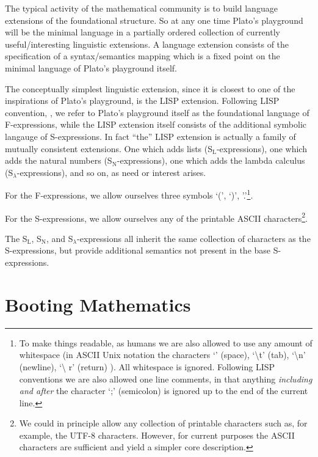 The typical activity of the mathematical community is to build language
extensions of the foundational structure. So at any one time Plato's playground
will be the minimal language in a partially ordered collection of currently
useful/interesting linguistic extensions. A language extension consists of the
specification of a syntax/semantics mapping which is a fixed point on the
minimal language of Plato's playground itself.

The conceptually simplest linguistic extension, since it is closest to one of
the inspirations of Plato's playground, is the LISP extension. Following LISP
convention, \cite{mcCarthy1960lisp}, we refer to Plato's playground itself as
the foundational language of F-expressions, while the LISP extension itself
consists of the additional symbolic langauge of S-expressions. In fact ``the''
LISP extension is actually a family of mutually consistent extensions. One which
adds lists (S$_{\text{L}}$-expressions), one which adds the natural numbers
(S$_{\text{N}}$-expressions), one which adds the lambda calculus
(S$_{\lambda}$-expressions), and so on, as need or interest arises.

For the F-expressions, we allow ourselves three symbols `(', `)',
'.'\footnote{To make things readable, as humans we are also allowed to use any
amount of whitespace (in ASCII Unix notation the characters `\textvisiblespace'
(space), `\textbackslash t' (tab), `\textbackslash n' (newline), `\textbackslash
r' (return) ). All whitespace is ignored. Following LISP conventions we are also
allowed one line comments, in that anything \emph{including and after} the
character `;' (semicolon) is ignored up to the end of the current line.}.

For the S-expressions, we allow ourselves any of the printable ASCII
characters\footnote{We could in principle allow any collection of printable
characters such as, for example, the UTF-8 characters. However, for current
purposes the ASCII characters are sufficient and yield a simpler core
description.}.

The S$_{\text{L}}$, S$_{\text{N}}$, and S$_{\lambda}$-expressions all inherit
the same collection of characters as the S-expressions, but provide additional
semantics not present in the base S-expressions.

\section{Booting Mathematics}

